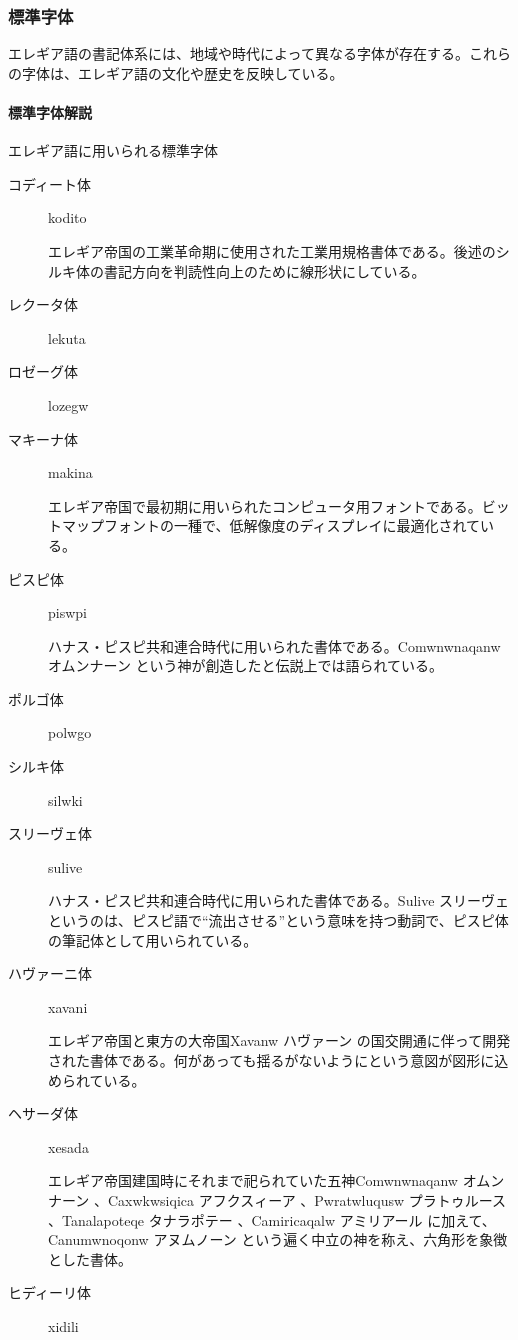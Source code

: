 \documentclass[
  japanese,
]{article}
\begin{document}
\subsubsection{標準字体}\label{section3.2}

エレギア語の書記体系には、地域や時代によって異なる字体が存在する。これらの字体は、エレギア語の文化や歴史を反映している。

\paragraph{標準字体解説}\label{subsection3.2.1}

エレギア語に用いられる標準字体

\begin{description}
\item[コディート体]
kodito

エレギア帝国の工業革命期に使用された工業用規格書体である。後述のシルキ体の書記方向を判読性向上のために線形状にしている。
\item[レクータ体]
lekuta
\item[ロゼーグ体]
lozegw
\item[マキーナ体]
makina

エレギア帝国で最初期に用いられたコンピュータ用フォントである。ビットマップフォントの一種で、低解像度のディスプレイに最適化されている。
\item[ピスピ体]
piswpi

ハナス・ピスピ共和連合時代に用いられた書体である。{Comwnwnaqanw}
オムンナーン という神が創造したと伝説上では語られている。
\item[ポルゴ体]
polwgo
\item[シルキ体]
silwki
\item[スリーヴェ体]
sulive

ハナス・ピスピ共和連合時代に用いられた書体である。{Sulive} スリーヴェ
というのは、ピスピ語で``流出させる''という意味を持つ動詞で、ピスピ体の筆記体として用いられている。
\item[ハヴァーニ体]
xavani

エレギア帝国と東方の大帝国{Xavanw} ハヴァーン
の国交開通に伴って開発された書体である。何があっても揺るがないようにという意図が図形に込められている。
\item[ヘサーダ体]
xesada

エレギア帝国建国時にそれまで祀られていた五神{Comwnwnaqanw} オムンナーン
、{Caxwkwsiqica} アフクスィーア 、{Pwratwluqusw} プラトゥルース
、{Tanalapoteqe} タナラポテー 、{Camiricaqalw} アミリアール
に加えて、{Canumwnoqonw} アヌムノーン
という遍く中立の神を称え、六角形を象徴とした書体。
\item[ヒディーリ体]
xidili


\end{description}
\end{document}
